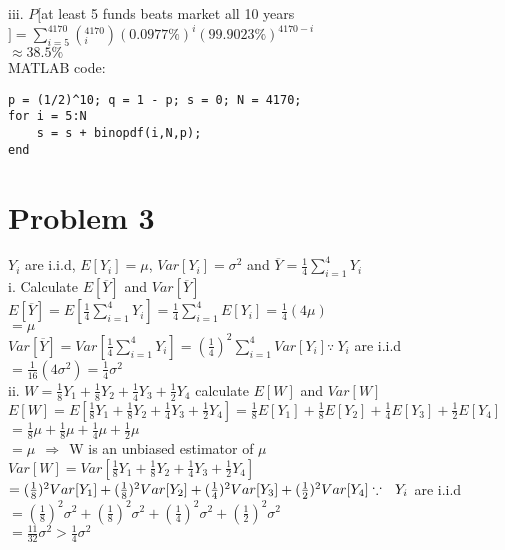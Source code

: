 \documentclass[11pt, oneside]{article}   	%
\begin{document}
iii. $P[$at least 5 funds beats market all 10 years$]=\sum_{i=5}^{4170} (_i ^{4170})(0.0977\%)^i (99.9023\%)^{4170-i}$\\
\indent$\approx38.5\%$\\

MATLAB code:
\begin{lstlisting}
p = (1/2)^10; q = 1 - p; s = 0; N = 4170;
for i = 5:N
	s = s + binopdf(i,N,p);
end
\end{lstlisting}


\section{Problem 3}
$Y_i$ are i.i.d, $E[Y_i]=\mu$, $Var[Y_i]=\sigma^{2}$ and $\overline{Y}=\frac{1}{4}\sum_{i=1}^{4}Y_i$\\

i. Calculate $E[\overline{Y}]$ and $Var[\overline{Y}]$\\
\indent$E[\overline{Y}]=E[\frac{1}{4}\sum_{i=1}^{4}Y_i]=\frac{1}{4}\sum_{i=1}^{4}E[Y_i]=\frac{1}{4}(4\mu)$\\
\indent\indent$=\mu$\\
\indent$Var[\overline{Y}]=Var[\frac{1}{4}\sum_{i=1}^{4}Y_i]=(\frac{1}{4})^{2}\sum_{i=1}^{4}Var[Y_i]$\hfill$\because\  Y_i$ are i.i.d\\
\indent\indent$=\frac{1}{16}(4\sigma^{2})=\frac{1}{4}\sigma^{2}$\\

ii. $W=\frac{1}{8}Y_1+\frac{1}{8}Y_2+\frac{1}{4}Y_3+\frac{1}{2}Y_4$ calculate $E[W]$ and $Var[W]$\\
$E[W]=E[\frac{1}{8}Y_1+\frac{1}{8}Y_2+\frac{1}{4}Y_3+\frac{1}{2}Y_4]=\frac{1}{8}E[Y_1]+\frac{1}{8}E[Y_2]+\frac{1}{4}E[Y_3]+\frac{1}{2}E[Y_4]$\\
\indent$=\frac{1}{8}\mu+\frac{1}{8}\mu+\frac{1}{4}\mu+\frac{1}{2}\mu$\\
\indent$=\mu\ \ \Rightarrow \ \ $W is an unbiased estimator of $\mu$\\
$Var[W]=Var[\frac{1}{8}Y_1+\frac{1}{8}Y_2+\frac{1}{4}Y_3+\frac{1}{2}Y_4]$\\
\indent$=(\frac{1}{8})^{2}Var[Y_1]+(\frac{1}{8})^{2}Var[Y_2]+(\frac{1}{4})^{2}Var[Y_3]+(\frac{1}{2})^{2}Var[Y_4]\hfill\because\ \ Y_i$ are i.i.d
\indent$=(\frac{1}{8})^{2}\sigma^{2}+(\frac{1}{8})^{2}\sigma^{2}+(\frac{1}{4})^{2}\sigma^{2}+(\frac{1}{2})^{2}\sigma^{2}$\\
\indent$=\frac{11}{32}\sigma^{2}>\frac{1}{4}\sigma^{2}$\\
\end{document}
